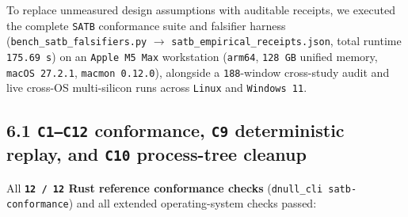 \documentclass[10pt,letterpaper]{article}
\begin{document}
To replace unmeasured design assumptions with auditable receipts, we
executed the complete \texttt{SATB} conformance suite and falsifier
harness (\texttt{bench\_\allowbreak{}satb\_\allowbreak{}falsifiers.\allowbreak{}py} \(\to\)
\texttt{satb\_\allowbreak{}empirical\_\allowbreak{}receipts.\allowbreak{}json}, total runtime
\texttt{175.69\ s}) on an \texttt{Apple\ M5\ Max} workstation
(\texttt{arm64}, \texttt{128\ GB} unified memory,
\texttt{macOS\ 27.\allowbreak{}2.\allowbreak{}1}, \texttt{macmon\ 0.\allowbreak{}12.\allowbreak{}0}), alongside a
\texttt{188}-window cross-study audit and live cross-OS multi-silicon
runs across \texttt{Linux} and \texttt{Windows\ 11}.

\subsection{\texorpdfstring{6.1 \texttt{C1–C12} conformance, \texttt{C9}
deterministic replay, and \texttt{C10} process-tree
cleanup}{6.1 C1--C12 conformance, C9 deterministic replay, and C10 process-tree cleanup}}\label{c1c12-conformance-c9-deterministic-replay-and-c10-process-tree-cleanup}

All \textbf{\texttt{12\ /\ 12} Rust reference conformance checks}
(\texttt{dnull\_\allowbreak{}cli\ satb-\allowbreak{}conformance}) and all extended
operating-system checks passed:
\end{document}
